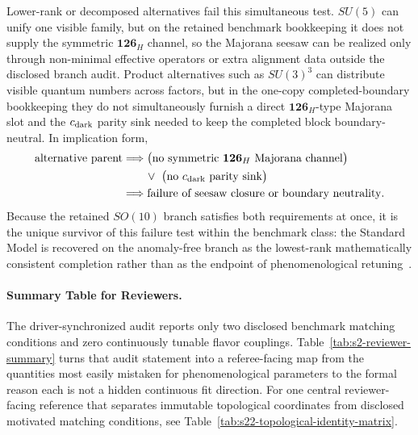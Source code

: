 \documentclass[11pt]{article}
\begin{document}
Lower-rank or decomposed alternatives fail this simultaneous test. $SU(5)$
can unify one visible family, but on the retained benchmark bookkeeping it does
not supply the symmetric $\mathbf{126}_H$ channel, so the Majorana seesaw can
be realized only through non-minimal effective operators or extra alignment
data outside the disclosed branch audit. Product alternatives such as
$SU(3)^3$ can distribute visible quantum numbers across factors, but in the
one-copy completed-boundary bookkeeping they do not simultaneously furnish a
direct $\mathbf{126}_H$-type Majorana slot and the $c_{\rm dark}$ parity sink
needed to keep the completed block boundary-neutral. In implication form,
\begin{equation}
 \begin{aligned}
  \text{alternative parent}
  &\Longrightarrow
  \bigl(\text{no symmetric }\mathbf{126}_H\text{ Majorana channel}\bigr) \\
  &\qquad \vee\
  \bigl(\text{no }c_{\rm dark}\text{ parity sink}\bigr) \\
  &\Longrightarrow
  \text{failure of seesaw closure or boundary neutrality}.
 \end{aligned}
\end{equation}
Because the retained $SO(10)$ branch satisfies both requirements at once, it
is the unique survivor of this failure test within the benchmark class: the
Standard Model is recovered on the anomaly-free branch as the lowest-rank
mathematically consistent completion rather than as the endpoint of
phenomenological retuning~\cite{babu1993,friedan1987,witten1989,gko1985}.

\paragraph*{Summary Table for Reviewers.}
The driver-synchronized audit reports only two disclosed benchmark matching
conditions and zero continuously tunable flavor couplings. Table~\ref{tab:s2-reviewer-summary}
turns that audit statement into a referee-facing map from the quantities most
easily mistaken for phenomenological parameters to the formal reason each is
not a hidden continuous fit direction. For one central reviewer-facing
reference that separates immutable topological coordinates from disclosed
motivated matching conditions, see
Table~\ref{tab:s22-topological-identity-matrix}.
\end{document}
